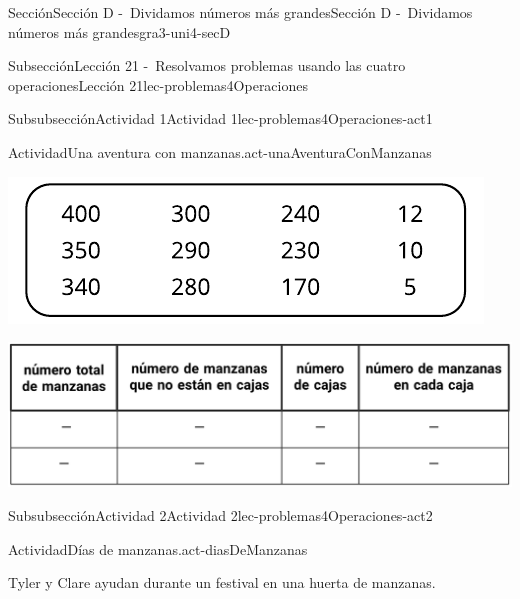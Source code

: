 \documentclass[twoside,10pt,]{article}
\begin{document}
\begin{sectionptx}{Sección}{Sección D -~Dividamos números más grandes}{}{Sección D -~Dividamos números más grandes}{}{}{gra3-uni4-secD}
\begin{subsectionptx}{Subsección}{Lección 21 -~Resolvamos problemas usando las cuatro operaciones}{}{Lección 21}{}{}{lec-problemas4Operaciones}
\begin{subsubsectionptx}{Subsubsección}{Actividad 1}{}{Actividad 1}{}{}{lec-problemas4Operaciones-act1}
\begin{activity}{Actividad}{Una aventura con manzanas.}{act-unaAventuraConManzanas}
\begin{image}{0}{1}{0}{}
\includegraphics[width=\linewidth]{external/svg-source/tikz-file-149345-scale13.pdf}
\end{image}%
\begin{image}{0}{1}{0}{}%
\includegraphics[width=\linewidth]{external/tikz-source/3-4-21-act1-tab-est-noLibroTrabajo.pdf}
\end{image}%
\end{activity}%
\end{subsubsectionptx}
%
%
\typeout{************************************************}
\typeout{************************************************}
%
\begin{subsubsectionptx}{Subsubsección}{Actividad 2}{}{Actividad 2}{}{}{lec-problemas4Operaciones-act2}
\begin{activity}{Actividad}{Días de manzanas.}{act-diasDeManzanas}%
\begin{sidebyside}{2}{0}{0.05}{0.05}%
\begin{sbspanel}{0.6}%
Tyler y Clare ayudan durante un festival en una huerta de manzanas.%
\end{sbspanel}%
\begin{sbspanel}{0.3}%

\end{sbspanel}
\end{sidebyside}
\end{activity}
\end{subsubsectionptx}
\end{subsectionptx}
\end{sectionptx}
\end{document}
